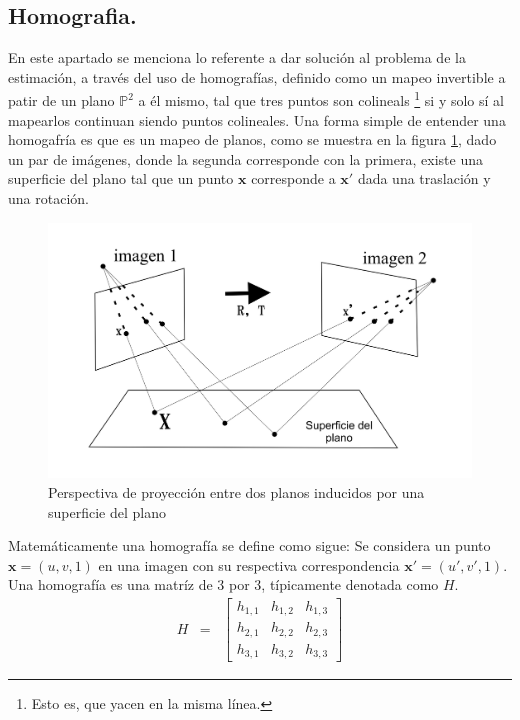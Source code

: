 \subsection{Homografia.}



En este apartado se menciona lo referente a dar solución al problema de la estimación, a través del uso de homografías, definido como un mapeo invertible a patir de un plano $\mathbb{P}^2$ a él mismo, tal que tres puntos son colineals \footnote{Esto es, que yacen en la misma línea.} si y solo sí al mapearlos continuan siendo puntos colineales. Una forma simple de entender una homogafría es que es un mapeo de planos, como se muestra en la figura \ref{fig::mapping}, dado un par de imágenes, donde la segunda corresponde con la primera, existe una superficie del plano tal que un punto $\mathbf{x}$ corresponde a $\mathbf{x'}$ dada una traslación y una rotación.
\\
 \begin{figure}[h]
\centering
\includegraphics[scale=0.35]{GraficosEdArt/Imagenpag36.png}
\caption{Perspectiva de proyección entre dos planos inducidos por una superficie del plano}
\label{fig::mapping}
\end{figure}  


Matemáticamente una homografía se define como sigue:
Se considera un punto $\mathbf{x} = (u,v,1)$ en una imagen con su respectiva correspondencia $\mathbf{x}' = (u',v',1)$. Una homografía es una matríz de 3 por 3, típicamente denotada como $H$.
\begin{equation}
\begin{aligned}
H & = & \left[\begin{array}{ccc}
h_{1,1} & h_{1,2} & h_{1,3} \\
h_{2,1} & h_{2,2} & h_{2,3} \\
h_{3,1} & h_{3,2} & h_{3,3} 
\end{array}\right]
\end{aligned}
\label{eq:homografyMat}
\end{equation}


